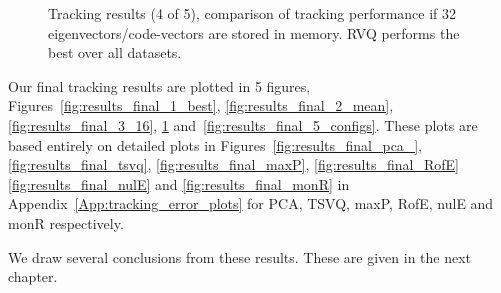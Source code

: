 \begin{Body}
								\begin{figure}[t]
								\centering
								
								\caption{Tracking results (4 of 5), comparison of tracking performance if 32 eigenvectors/code-vectors are stored in memory.  RVQ performs the best over all datasets.}
								\label{fig:results_final_4_32}
								\end{figure}

Our final tracking results are plotted in 5 figures, Figures~\ref{fig:results_final_1_best}, \ref{fig:results_final_2_mean}, \ref{fig:results_final_3_16}, \ref{fig:results_final_4_32} and~\ref{fig:results_final_5_configs}.  These plots are based entirely on detailed plots in Figures~\ref{fig:results_final_pca_}, \ref{fig:results_final_tsvq}, \ref{fig:results_final_maxP}, \ref{fig:results_final_RofE} \ref{fig:results_final_nulE} and \ref{fig:results_final_monR} in Appendix~\ref{App:tracking_error_plots} for PCA, TSVQ, maxP, RofE, nulE and monR respectively.

We draw several conclusions from these results.  These are given in the next chapter.


\end{Body}
